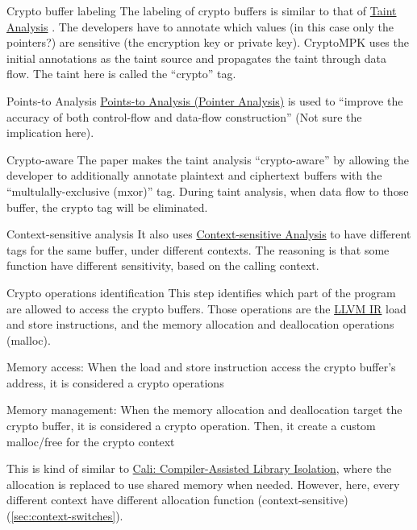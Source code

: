 \documentclass[presentation]{beamer}
\begin{document}
\begin{frame}[label={sec:orgc714d47}]{Crypto buffer labeling}
The labeling of crypto buffers is similar to that of \href{20211116143831-taint_analysis.org}{Taint Analysis} . The developers have to annotate which values (in this case only the pointers?) are sensitive (the encryption key or private key). CryptoMPK uses the initial annotations as the taint source and propagates the taint through data flow. The taint here is called the ``crypto'' tag.

\begin{block}{Points-to Analysis}
\href{20211116154224-points_to_analysis.org}{Points-to Analysis (Pointer Analysis)} is used to ``improve the accuracy of both control-flow and data-flow construction'' (Not sure the implication here).
\end{block}

\begin{block}{Crypto-aware}
The paper makes the taint analysis ``crypto-aware'' by allowing the developer to additionally annotate plaintext and ciphertext buffers with the ``multulally-exclusive (mxor)'' tag. During taint analysis, when data flow to those buffer, the crypto tag will be eliminated.
\end{block}

\begin{block}{Context-sensitive analysis}
It also uses \href{20211116180223-context_sensitive_analysis.org}{Context-sensitive Analysis} to have different tags for the same buffer, under different contexts. The reasoning is that some function have different sensitivity, based on the calling context.
\end{block}
\end{frame}


\begin{frame}[label={sec:org4824c91}]{Crypto operations identification}
\label{sec:crypto-op} This step identifies which part of the program are allowed to access the crypto buffers. Those operations are the \href{20211116153642-llvm_ir.org}{LLVM IR} load and store instructions, and the memory allocation and deallocation operations (malloc).

\alert{Memory access}: When the load and store instruction access the crypto buffer's address, it is considered a crypto operations

\alert{Memory management:} When the memory allocation and deallocation target the crypto buffer, it is considered a crypto operation. Then, it create a custom malloc/free for the crypto context

This is kind of similar to \href{20211111115728-cali_compiler_assisted_library_isolation.org}{Cali: Compiler-Assisted Library Isolation}, where the allocation is replaced to use shared memory when needed. However, here, every different context have different allocation function (context-sensitive)(\ref{sec:context-switches}).
\end{frame}
\end{document}
